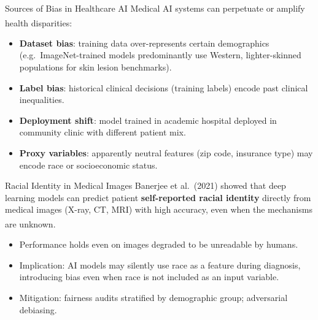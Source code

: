 \begin{v3topic}{Sources of Bias in Healthcare AI}
    Medical AI systems can perpetuate or amplify health disparities\textsuperscript{\cite[][p.~232]{challenArtificialIntelligenceBias2019}}:
    \begin{itemize}
        \item \textbf{Dataset bias}: training data over-represents certain demographics (e.g.\ ImageNet-trained models predominantly use Western, lighter-skinned populations for skin lesion benchmarks).
        \item \textbf{Label bias}: historical clinical decisions (training labels) encode past clinical inequalities.
        \item \textbf{Deployment shift}: model trained in academic hospital deployed in community clinic with different patient mix.
        \item \textbf{Proxy variables}: apparently neutral features (zip code, insurance type) may encode race or socioeconomic status.
    \end{itemize}

\end{v3topic}
\begin{v3topic}{Racial Identity in Medical Images}
    Banerjee et al.\ (2021) showed that deep learning models can predict patient \textbf{self-reported racial identity} directly from medical images (X-ray, CT, MRI) with high accuracy, even when the mechanisms are unknown\textsuperscript{\cite[][]{banerjeeReadingRaceAI2021}}.
    \begin{itemize}
        \item Performance holds even on images degraded to be unreadable by humans.
        \item Implication: AI models may silently use race as a feature during diagnosis, introducing bias even when race is not included as an input variable.
        \item Mitigation: fairness audits stratified by demographic group; adversarial debiasing.
    \end{itemize}

\end{v3topic}
